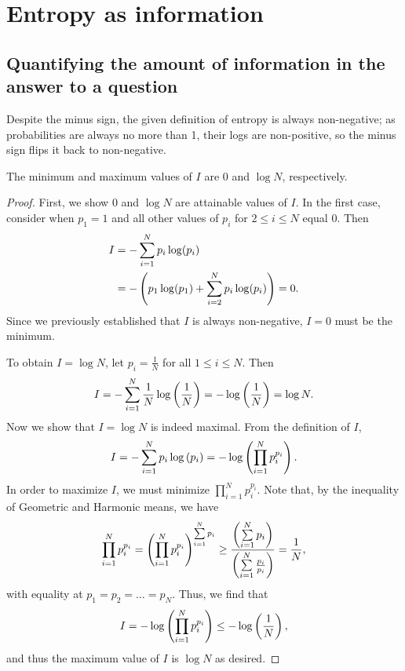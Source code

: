 \documentclass{paper}
\begin{document}
\section{Entropy as information}
\subsection{Quantifying the amount of information in the answer to a question}

\par Despite the minus sign, the given definition of entropy is always non-negative; as probabilities are always no more than 1, their logs are non-positive, so the minus sign flips it back to non-negative.

\begin{claim}
    The minimum and maximum values of $I$ are $0$ and $\log N$, respectively.
\end{claim}
    
\begin{proof}
    First, we show $0$ and $\log N$ are attainable values of $I$. In the first case, consider when $p_1=1$ and all other values of $p_i$ for $2\leq i \leq N$ equal $0$. Then
        \begin{align*}
            I &= -\sum\limits_{i=1}^{N} p_i\log(p_i)\\
            &= -\left( p_1\log(p_1) + \sum\limits_{i=2}^{N} p_i\log(p_i) \right) = 0.
        \end{align*}
    Since we previously established that $I$ is always non-negative, $I=0$ must be the minimum.
    
    To obtain $I=\log N$, let $p_i=\frac{1}{N}$ for all $1\leq i\leq N$. Then 
        \[
            I = -\sum\limits_{i=1}^{N} \frac{1}{N}\log\left(\frac{1}{N}\right)
            = -\log\left(\frac{1}{N}\right) = \log N.
        \]
    Now we show that $I=\log N$ is indeed maximal. From the definition of $I$,
        \[
            I = -\sum\limits_{i=1}^{N} p_i\log\left( p_i \right)
            = -\log\left( \prod\limits_{i=1}^{N} p_i^{p_i} \right).
        \]
    In order to maximize $I$, we must minimize $\prod\limits_{i=1}^{N} p_i^{p_i}$. Note that, by the inequality of Geometric and Harmonic means, we have
        \[
            \prod\limits_{i=1}^{N}p_i^{p_i} 
            = \left( \prod\limits_{i=1}^{N}p_i^{p_i} \right)^{\sum\limits_{i=1}^{N} p_i}
            \geq \frac{\left(\sum\limits_{i=1}^{N} p_i\right)}{\left(\sum\limits_{i=1}^{N} \frac{p_i}{p_i}\right)}
            = \frac{1}{N},
        \]
    with equality at $p_1=p_2=\ldots=p_N$. Thus, we find that
        \[ I = -\log\left( \prod\limits_{i=1}^{N} p_i^{p_i}\right) \leq -\log\left(\frac{1}{N}\right), \]
    and thus the maximum value of $I$ is $\log N$ as desired.
\end{proof}
\end{document}
